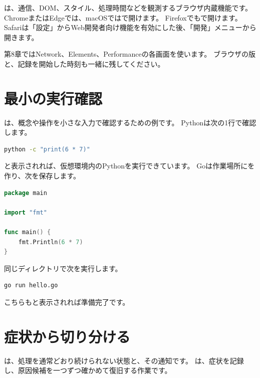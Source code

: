 は、通信、DOM、スタイル、処理時間などを観測するブラウザ内蔵機能です。
ChromeまたはEdgeでは、macOSではで開けます。
Firefoxでもで開けます。
Safariは「設定」からWeb開発者向け機能を有効にした後、「開発」メニューから開きます。

第8章ではNetwork、Elements、Performanceの各画面を使います。
ブラウザの版と、記録を開始した時刻も一緒に残してください。

\section{最小の実行確認}

は、概念や操作を小さな入力で確認するための例です。
Pythonは次の1行で確認します。

\begin{lstlisting}[language=bash]
python -c "print(6 * 7)"
\end{lstlisting}

と表示されれば、仮想環境内のPythonを実行できています。
Goは作業場所にを作り、次を保存します。

\begin{lstlisting}[language=go]
package main

import "fmt"

func main() {
    fmt.Println(6 * 7)
}
\end{lstlisting}

同じディレクトリで次を実行します。

\begin{lstlisting}[language=bash]
go run hello.go
\end{lstlisting}

こちらもと表示されれば準備完了です。

\section{症状から切り分ける}

は、処理を通常どおり続けられない状態と、その通知です。
は、症状を記録し、原因候補を一つずつ確かめて復旧する作業です。

